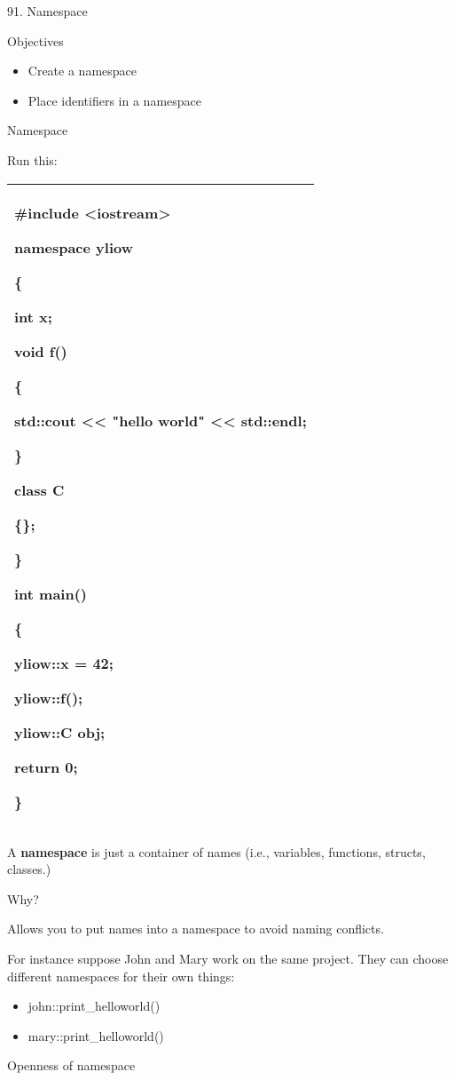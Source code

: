 \documentclass[
]{article}
\author{}
\date{}
\providecommand{\tightlist}{%
  \setlength{\itemsep}{0pt}\setlength{\parskip}{0pt}}
\begin{document}
91. Namespace

Objectives

\begin{itemize}
\tightlist
\item
  Create a namespace
\item
  Place identifiers in a namespace
\end{itemize}

Namespace

Run this:

\begin{longtable}[]{@{}l@{}}
\toprule
\endhead
\begin{minipage}[t]{0.97\columnwidth}\raggedright
\#include \textless iostream\textgreater{}

namespace yliow

\{

int x;

void f()

\{

std::cout \textless\textless{} "hello world" \textless\textless{}
std::endl;

\}

class C

\{\};

\}

int main()

\{

yliow::x = 42;

yliow::f();

yliow::C obj;

return 0;

\}\strut
\end{minipage}\tabularnewline
\bottomrule
\end{longtable}

A \textbf{namespace} is just a container of names (i.e., variables,
functions, structs, classes.)

Why?

Allows you to put names into a namespace to avoid naming conflicts.

For instance suppose John and Mary work on the same project. They can
choose different namespaces for their own things:

\begin{itemize}
\tightlist
\item
  john::print\_helloworld()
\item
  mary::print\_helloworld()
\end{itemize}

Openness of namespace
\end{document}
